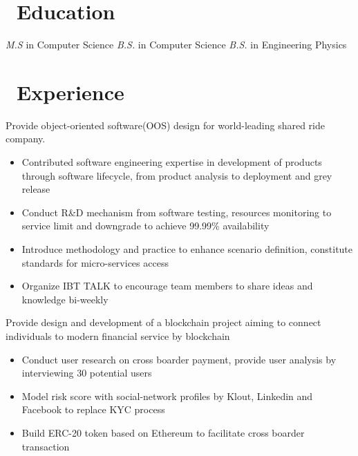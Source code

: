 \documentclass{resume}
\begin{document}



\section{\faGraduationCap\ Education}
\textit{M.S} in Computer Science
\textit{B.S.} in Computer Science
\datedsubsection{\textbf{University of Illinois at Urbana-Champaign}, Urbana, USA}{2012 -- 2016}
\textit{B.S.} in Engineering Physics

\section{\faUsers\ Experience}
Provide object-oriented software(OOS) design for world-leading shared ride company.
\begin{itemize}
  \item Contributed software engineering expertise in development of products through software lifecycle, from product analysis to deployment and grey release
  \item Conduct R&D mechanism from software testing, resources monitoring to service limit and downgrade to achieve 99.99\% availability
  \item Introduce methodology and practice to enhance scenario definition, constitute standards for micro-services access
  \item Organize IBT TALK to encourage team members to share ideas and knowledge bi-weekly
\end{itemize}

Provide design and development of a blockchain project aiming to connect individuals to modern financial service by blockchain
\begin{itemize}
  \item Conduct user research on cross boarder payment, provide user analysis by interviewing 30 potential users
  \item Model risk score with social-network profiles by Klout, Linkedin and Facebook to replace KYC process
  \item Build ERC-20 token based on Ethereum to facilitate cross boarder transaction
\end{itemize}
\end{document}
